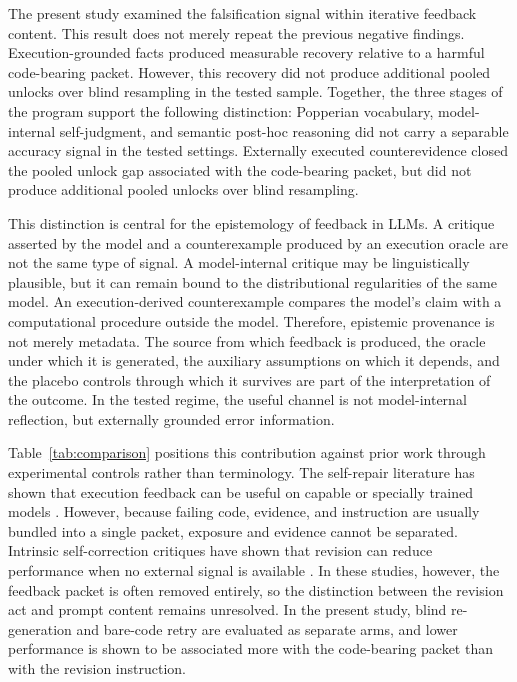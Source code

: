 \documentclass{article}
\numberwithin{equation}{section}  %
\theoremstyle{definition}
\begin{document}
The present study examined the falsification signal within iterative feedback content. This
result does not merely repeat the previous negative findings. Execution-grounded facts
produced measurable recovery relative to a harmful code-bearing packet. However, this recovery
did not produce additional pooled unlocks over blind resampling in the tested sample.
Together, the three stages of the program support the following distinction: Popperian
vocabulary, model-internal self-judgment, and semantic post-hoc reasoning did not carry a
separable accuracy signal in the tested settings. Externally executed counterevidence closed
the pooled unlock gap associated with the code-bearing packet, but did not produce
additional pooled unlocks over blind resampling.

This distinction is central for the epistemology of feedback in LLMs. A critique asserted by
the model and a counterexample produced by an execution oracle are not the same type of
signal. A model-internal critique may be linguistically plausible, but it can remain bound to
the distributional regularities of the same model. An execution-derived counterexample
compares the model's claim with a computational procedure outside the model. Therefore,
epistemic provenance is not merely metadata. The source from which feedback is produced, the
oracle under which it is generated, the auxiliary assumptions on which it depends, and the
placebo controls through which it survives are part of the interpretation of the outcome. In
the tested regime, the useful channel is not model-internal reflection, but externally
grounded error information.

Table~\ref{tab:comparison} positions this contribution against prior work through
experimental controls rather than terminology. The self-repair literature has shown that
execution feedback can be useful on capable or specially trained models
\citep{madaan2023selfrefine,chen2024selfdebug,zhong2024ldb,
zheng2024opencodeinterpreter}. However, because failing code, evidence, and instruction are
usually bundled into a single packet, exposure and evidence cannot be separated. Intrinsic
self-correction critiques have shown that revision can reduce performance when no external
signal is available
\citep{huang2024cannot,valmeekam2023self,stechly2025selfverification}. In these studies,
however, the feedback packet is often removed entirely, so the distinction between the
revision act and prompt content remains unresolved. In the present study, blind
re-generation and bare-code retry are evaluated as separate arms, and lower performance is
shown to be associated more with the code-bearing packet than with the revision instruction.
\end{document}
